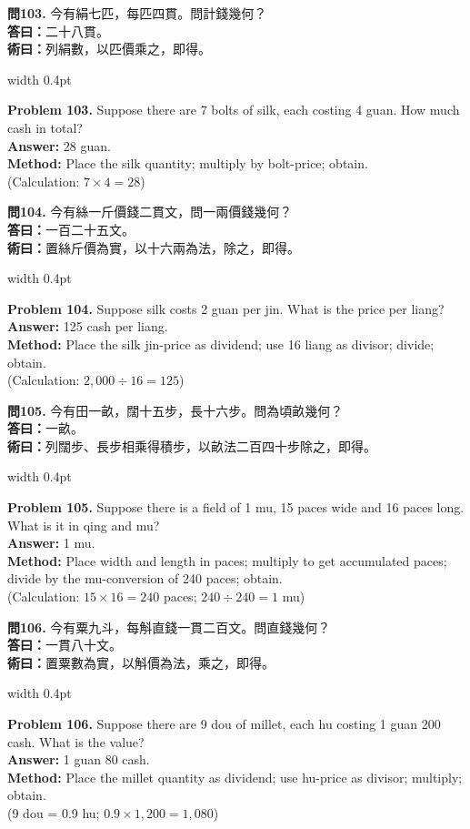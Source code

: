 \documentclass[10pt,a4paper]{article}
\newlength{\cnwidth}
\newlength{\enwidth}
\newcommand{\bilingual}[2]{%
  \noindent%
  \begin{minipage}[t]{\cnwidth}%
    #1%
  \end{minipage}%
  \hfill\vrule width 0.4pt\hfill%
  \begin{minipage}[t]{\enwidth}%
    #2%
  \end{minipage}%
  \par\smallskip%
}
\begin{document}
\bilingual{%
  \textbf{問103.}
  今有絹七匹，每匹四貫。問計錢幾何？\\
  \textbf{答曰：}二十八貫。\\
  \textbf{術曰：}列絹數，以匹價乘之，即得。
}{%
  \textbf{Problem 103.}
  Suppose there are 7 bolts of silk, each costing 4 guan.
  How much cash in total?\\
  \textbf{Answer:} 28 guan.\\
  \textbf{Method:} Place the silk quantity; multiply by bolt-price; obtain.\\
  (Calculation: $7 \times 4 = 28$)
}

\bilingual{%
  \textbf{問104.}
  今有絲一斤價錢二貫文，問一兩價錢幾何？\\
  \textbf{答曰：}一百二十五文。\\
  \textbf{術曰：}置絲斤價為實，以十六兩為法，除之，即得。
}{%
  \textbf{Problem 104.}
  Suppose silk costs 2 guan per jin. What is the price per liang?\\
  \textbf{Answer:} 125 cash per liang.\\
  \textbf{Method:} Place the silk jin-price as dividend; use 16 liang as divisor;
  divide; obtain.\\
  (Calculation: $2{,}000 \div 16 = 125$)
}

\bilingual{%
  \textbf{問105.}
  今有田一畝，闊十五步，長十六步。問為頃畝幾何？\\
  \textbf{答曰：}一畝。\\
  \textbf{術曰：}列闊步、長步相乘得積步，以畝法二百四十步除之，即得。
}{%
  \textbf{Problem 105.}
  Suppose there is a field of 1 mu, 15 paces wide and 16 paces long.
  What is it in qing and mu?\\
  \textbf{Answer:} 1 mu.\\
  \textbf{Method:} Place width and length in paces; multiply to get accumulated paces;
  divide by the mu-conversion of 240 paces; obtain.\\
  (Calculation: $15 \times 16 = 240$ paces; $240 \div 240 = 1$ mu)
}

\bilingual{%
  \textbf{問106.}
  今有粟九斗，每斛直錢一貫二百文。問直錢幾何？\\
  \textbf{答曰：}一貫八十文。\\
  \textbf{術曰：}置粟數為實，以斛價為法，乘之，即得。
}{%
  \textbf{Problem 106.}
  Suppose there are 9 dou of millet, each hu costing 1 guan 200 cash.
  What is the value?\\
  \textbf{Answer:} 1 guan 80 cash.\\
  \textbf{Method:} Place the millet quantity as dividend; use hu-price as divisor;
  multiply; obtain.\\
  (9 dou = 0.9 hu; $0.9 \times 1{,}200 = 1{,}080$)
}
\end{document}

